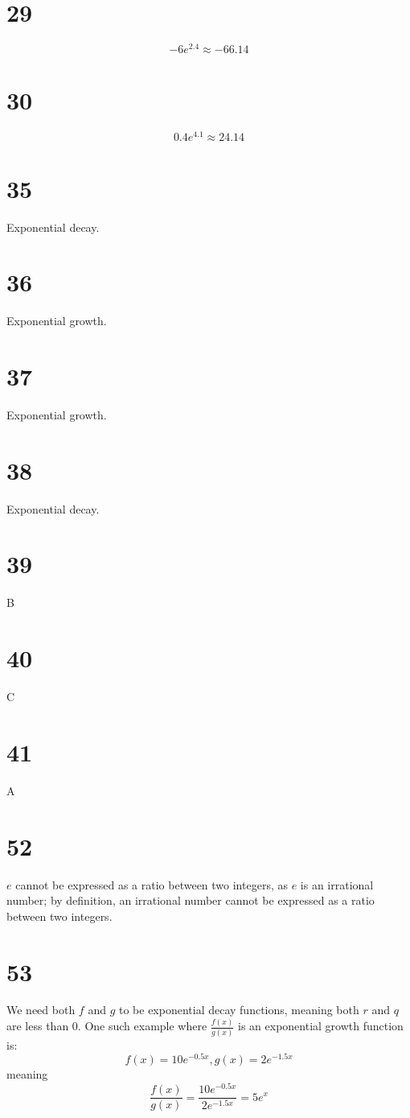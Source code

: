 \documentclass{article}
\theoremstyle{definition}
\newcommand{\?}{\stackrel{?}{=}}
\begin{document}
\section*{29}
\[ -6e^{2.4}\approx -66.14 \]

\section*{30}
\[ 0.4e^{4.1}\approx 24.14 \]

\section*{35}
Exponential decay.

\section*{36}
Exponential growth.

\section*{37}
Exponential growth.

\section*{38}
Exponential decay.

\section*{39}
B

\section*{40}
C

\section*{41}
A

\section*{52}
$e$ cannot be expressed as a ratio between two integers, as $e$ is an irrational number; by definition, an irrational number cannot be expressed as a 
ratio between two integers.

\section*{53}
We need both $f$ and $g$ to be exponential decay functions, meaning both $r$ and $q$ are less than 0. One such example where 
$\frac{f(x)}{g(x)}$ is an exponential growth function is:
\[ f(x)=10e^{-0.5x},g(x)=2e^{-1.5x} \] meaning \[ \frac{f(x)}{g(x)}=\frac{10e^{-0.5x}}{2e^{-1.5x}}=5e^{x} \]
\end{document}
